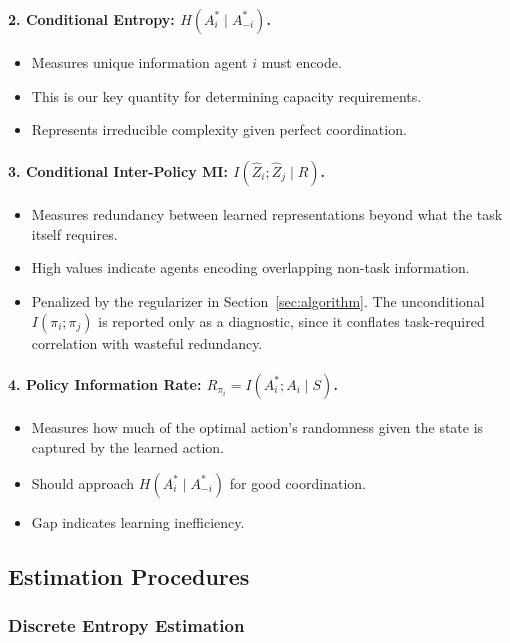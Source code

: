 \documentclass[10pt, letterpaper]{article}
\begin{document}
\paragraph{2. Conditional Entropy: $H(A_i^* \mid A_{-i}^*)$.}
\begin{itemize}
    \item Measures unique information agent $i$ must encode.
    \item This is our key quantity for determining capacity requirements.
    \item Represents irreducible complexity given perfect coordination.
\end{itemize}

\paragraph{3. Conditional Inter-Policy MI: $I(\hat{Z}_i; \hat{Z}_j \mid R)$.}
\begin{itemize}
    \item Measures redundancy between learned representations beyond what the task itself requires.
    \item High values indicate agents encoding overlapping non-task information.
    \item Penalized by the regularizer in Section~\ref{sec:algorithm}. The unconditional $I(\pi_i; \pi_j)$ is reported only as a diagnostic, since it conflates task-required correlation with wasteful redundancy.
\end{itemize}

\paragraph{4. Policy Information Rate: $R_{\pi_i} = I(A_i^*; A_i \mid S)$.}
\begin{itemize}
    \item Measures how much of the optimal action's randomness given the state is captured by the learned action.
    \item Should approach $H(A_i^* \mid A_{-i}^*)$ for good coordination.
    \item Gap indicates learning inefficiency.
\end{itemize}

\subsection{Estimation Procedures}

\subsubsection{Discrete Entropy Estimation}
\end{document}
